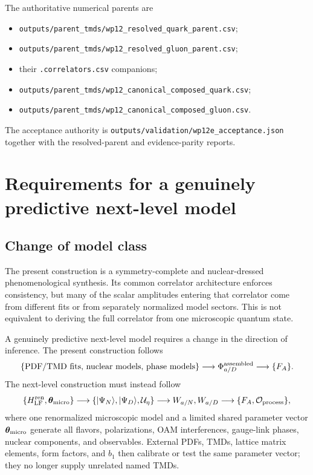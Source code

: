 \documentclass[11pt]{article}
\begin{document}
The authoritative numerical parents are
\begin{itemize}
  \item \texttt{outputs/parent\_tmds/wp12\_resolved\_quark\_parent.csv};
  \item \texttt{outputs/parent\_tmds/wp12\_resolved\_gluon\_parent.csv};
  \item their \texttt{.correlators.csv} companions;
  \item \texttt{outputs/parent\_tmds/wp12\_canonical\_composed\_quark.csv};
  \item \texttt{outputs/parent\_tmds/wp12\_canonical\_composed\_gluon.csv}.
\end{itemize}
The acceptance authority is
\texttt{outputs/validation/wp12e\_acceptance.json} together with the
resolved-parent and evidence-parity reports.

\section{Requirements for a genuinely predictive next-level model}
\label{sec:next-level}

\subsection{Change of model class}

The present construction is a symmetry-complete and nuclear-dressed
phenomenological synthesis.  Its common correlator architecture enforces
consistency, but many of the scalar amplitudes entering that correlator come
from different fits or from separately normalized model sectors.  This is
not equivalent to deriving the full correlator from one microscopic quantum
state.

A genuinely predictive next-level model requires a change in the direction
of inference.  The present construction follows
\begin{equation}
\{\text{PDF/TMD fits, nuclear models, phase models}\}
\longrightarrow
\Phi_{a/D}^{\rm assembled}
\longrightarrow
\{F_A\}.
\label{eq:assembled-direction}
\end{equation}
The next-level construction must instead follow
\begin{equation}
\{H_{\rm LF}^{\rm ren},\bm\theta_{\rm micro}\}
\longrightarrow
\{|\Psi_N\rangle,|\Psi_D\rangle,\mathcal U_\eta\}
\longrightarrow
W_{a/N},W_{a/D}
\longrightarrow
\{F_A,\mathcal O_{\rm process}\},
\label{eq:generative-direction}
\end{equation}
where one renormalized microscopic model and a limited shared parameter
vector \(\bm\theta_{\rm micro}\) generate all flavors, polarizations, OAM
interferences, gauge-link phases, nuclear components, and observables.
External PDFs, TMDs, lattice matrix elements, form factors, and \(b_1\) then
calibrate or test the same parameter vector; they no longer supply unrelated
named TMDs.
\end{document}
